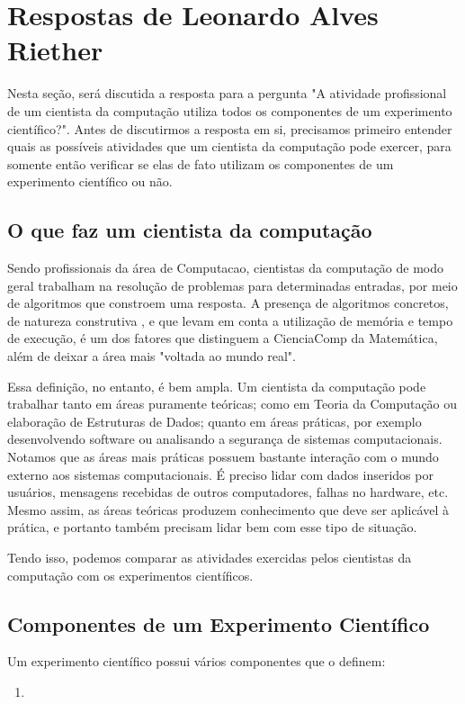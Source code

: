 \section{Respostas de Leonardo Alves Riether\label{tarefa-LeoRiether-componentes-eperimento}}

Nesta seção, será discutida a resposta para a pergunta "A atividade profissional de um
cientista da computação utiliza todos os componentes de um experimento científico?". Antes
de discutirmos a resposta em si, precisamos primeiro entender quais as possíveis
atividades que um cientista da computação pode exercer, para somente então verificar se
elas de fato utilizam os componentes de um experimento científico ou não.

\subsection{O que faz um cientista da computação}

Sendo profissionais da área de \gls{Computacao}, cientistas da computação de modo geral
trabalham na resolução de problemas para determinadas entradas, por meio de algoritmos que
constroem uma resposta. A presença de algoritmos concretos, de natureza construtiva , e
que levam em conta a utilização de memória e tempo de execução, é um dos fatores que
distinguem a \gls{CienciaComp} da Matemática, além de deixar a área mais "voltada ao mundo
real".

Essa definição, no entanto, é bem ampla. Um cientista da computação pode trabalhar tanto
em áreas puramente teóricas; como em Teoria da Computação ou elaboração de Estruturas de
Dados; quanto em áreas práticas, por exemplo desenvolvendo software ou analisando a
segurança de sistemas computacionais. Notamos que as áreas mais práticas possuem bastante
interação com o mundo externo aos sistemas computacionais. É preciso lidar com dados
inseridos por usuários, mensagens recebidas de outros computadores, falhas no hardware,
etc. Mesmo assim, as áreas teóricas produzem conhecimento que deve ser aplicável à
prática, e portanto também precisam lidar bem com esse tipo de situação.

Tendo isso, podemos comparar as atividades exercidas pelos cientistas da computação com os
experimentos científicos.

\subsection{Componentes de um Experimento Científico}
Um \gls{experimento} científico possui vários componentes que o definem:

\begin{enumerate}
    \item 
\end{enumerate}